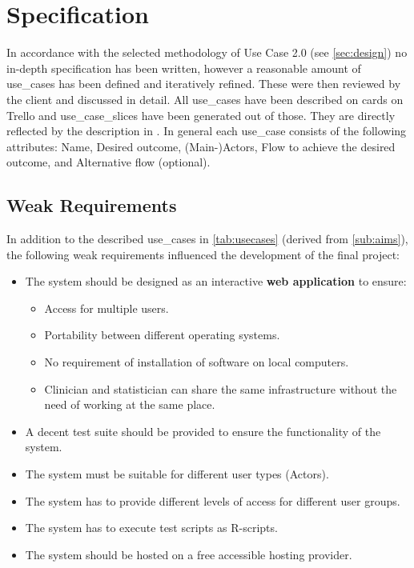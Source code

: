 \section{Specification}
\label{sec:specification}

In accordance with the selected methodology of Use Case 2.0 (see \autoref{sec:design}) no in-depth specification has been written, however a reasonable amount of \glspl{use_case} has been defined and iteratively refined. These were then reviewed by the client and discussed in detail. All \glspl{use_case} have been described on cards on Trello and \glspl{use_case_slice} have been generated out of those. They are directly reflected by the description in \cite{sassoon2016,sassoon2014, sassoon2016CD}. In general each \gls{use_case} consists of the following attributes: Name, Desired outcome, (Main-)\Glspl{Actor}, Flow to achieve the desired outcome, and Alternative flow (optional).


\subsection{Weak Requirements}
\label{sub:weak}
In addition to the described \glspl{use_case} in \autoref{tab:usecases} (derived from \autoref{sub:aims}), the following weak requirements influenced the development of the final project:


\begin{itemize}
	\item The system should be designed as an interactive \textbf{web application} to ensure:
	\begin{itemize}
		\item Access for multiple users.
		\item Portability between different operating systems.
		\item No requirement of installation of software on local computers.
		\item Clinician and statistician can share the same infrastructure without the need of working at the same place.
	\end{itemize}
	\item A decent test suite should be provided to ensure the functionality of the system.
	\item The system must be suitable for different user types (\glspl{Actor}).
	\item The system has to provide different levels of access for different user groups.
	\item The system has to execute test scripts as \gls{R}-scripts.
	\item The system should be hosted on a free accessible hosting provider.
\end{itemize}


